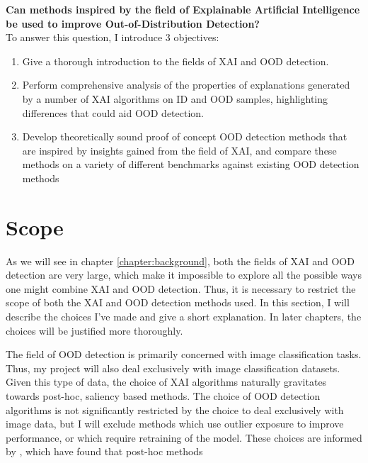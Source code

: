 \documentclass[UKenglish]{uiomasterthesis} %
\theoremstyle{definition}
\begin{document}
\textbf{Can methods inspired by the field of Explainable Artificial Intelligence be used to improve Out-of-Distribution Detection?}
\\

To answer this question, I introduce 3 objectives:

\begin{enumerate}
  \item Give a thorough introduction to the fields of XAI and OOD detection.
  \item Perform comprehensive analysis of the properties of explanations generated by a number of XAI algorithms on ID and OOD samples, highlighting differences that could aid OOD detection.
  \item Develop theoretically sound proof of concept OOD detection methods that are inspired by insights gained from the field of XAI, and compare these methods on a variety of different benchmarks against existing OOD detection methods
\end{enumerate}

\section{Scope}

As we will see in chapter \ref{chapter:background}, both the fields of XAI and OOD detection are very large, which make it impossible to explore all the possible ways one might combine XAI and OOD detection. Thus, it is necessary to restrict the scope of both the XAI and OOD detection methods used. In this section, I will describe the choices I've made and give a short explanation. In later chapters, the choices will be justified more thoroughly.

The field of OOD detection is primarily concerned with image classification tasks. Thus, my project will also deal exclusively with image classification datasets. Given this type of data, the choice of XAI algorithms naturally gravitates towards post-hoc, saliency based methods. The choice of OOD detection algorithms is not significantly restricted by the choice to deal exclusively with image data, but I will exclude methods which use outlier exposure to improve performance, or which require retraining of the model. These choices are informed by \cite{openood}, which have found that post-hoc methods

\end{document}
